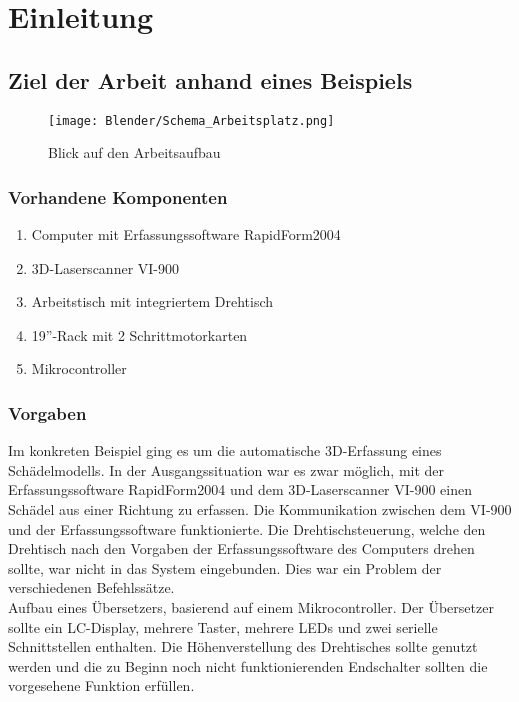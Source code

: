 \chapter{Einleitung}
\label{cha:Einleitung}

\newpage 


\section{Ziel der Arbeit anhand eines Beispiels} 
\label{sec:ZielDerArbeit}
\begin{figure}[htb]
\centering
\texttt{[image: Blender/Schema\_Arbeitsplatz.png]}
\caption{Blick auf den Arbeitsaufbau}
\label{fig:Übersicht}
\end{figure}

\subsection{Vorhandene Komponenten}
\begin{enumerate}
\item Computer mit Erfassungssoftware RapidForm2004
\item 3D-Laserscanner VI-900
\item Arbeitstisch mit integriertem Drehtisch
\item 19''-Rack mit 2 Schrittmotorkarten
\item Mikrocontroller
\end{enumerate}
\subsection{Vorgaben}
Im konkreten Beispiel ging es um die automatische 3D-Erfassung eines Schädelmodells. In der Ausgangssituation war es zwar möglich, mit der Erfassungssoftware RapidForm2004 und dem 3D-Laserscanner VI-900  einen Schädel aus einer Richtung zu erfassen. Die Kommunikation zwischen dem VI-900 und der Erfassungssoftware funktionierte. Die Drehtischsteuerung, welche den Drehtisch nach den Vorgaben der Erfassungssoftware des Computers drehen sollte, war nicht in das System eingebunden. Dies war ein Problem der verschiedenen Befehlssätze.\\
Aufbau eines Übersetzers, basierend auf einem Mikrocontroller. Der Übersetzer sollte ein LC-Display, mehrere Taster, mehrere LEDs und zwei serielle Schnittstellen enthalten. Die Höhenverstellung des Drehtisches sollte genutzt werden und die zu Beginn noch nicht funktionierenden Endschalter sollten die vorgesehene Funktion erfüllen.
